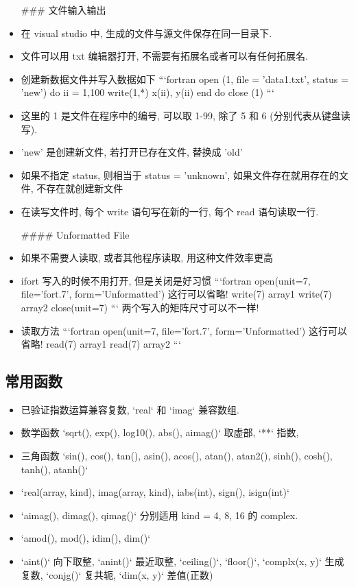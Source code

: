 \begin{itemize}
### 文件输入输出
\item 在 visual studio 中, 生成的文件与源文件保存在同一目录下.
\item 文件可以用 txt 编辑器打开, 不需要有拓展名或者可以有任何拓展名.
\item 创建新数据文件并写入数据如下
```fortran
open (1, file = 'data1.txt', status = 'new')
do ii = 1,100
	write(1,*) x(ii), y(ii)
end do
close (1)
```
\item 这里的 1 是文件在程序中的编号, 可以取 1-99, 除了 5 和 6 (分别代表从键盘读写).
\item 'new' 是创建新文件, 若打开已存在文件, 替换成 'old'
\item 如果不指定 status, 则相当于 status = 'unknown', 如果文件存在就用存在的文件, 不存在就创建新文件
\item 在读写文件时, 每个 write 语句写在新的一行, 每个 read 语句读取一行.

#### Unformatted File
\item 如果不需要人读取, 或者其他程序读取, 用这种文件效率更高
\item ifort 写入的时候不用打开, 但是关闭是好习惯
```fortran
open(unit=7, file='fort.7', form='Unformatted') 这行可以省略!
write(7) array1
write(7) array2
close(unit=7)
```
两个写入的矩阵尺寸可以不一样!

\item 读取方法
```fortran
open(unit=7, file='fort.7', form='Unformatted') 这行可以省略!
read(7) array1
read(7) array2
```
\end{itemize}

\subsection{常用函数}
\begin{itemize}
\item 已验证指数运算兼容复数, `real` 和 `imag` 兼容数组.
\item 数学函数 `sqrt(), exp(), log10(), abs(), aimag()` 取虚部, `**` 指数, 
\item 三角函数 `sin(), cos(), tan(), asin(), acos(), atan(), atan2(), sinh(), cosh(), tanh(), atanh()`
\item `real(array, kind),  imag(array, kind), iabs(int), sign(), isign(int)`
\item `aimag(), dimag(), qimag()` 分别适用 kind = 4, 8, 16 的 complex.
\item `amod(),  mod(),  idim(), dim()`
\item `aint()` 向下取整, `anint()` 最近取整, `ceiling()`, `floor()`, `complx(x, y)` 生成复数, `conjg()` 复共轭, `dim(x, y)` 差值(正数)
\end{itemize}

